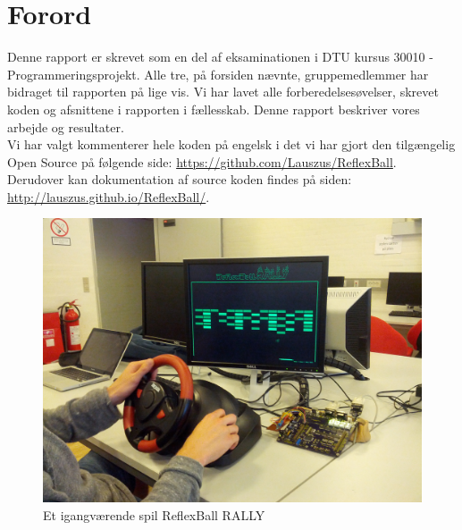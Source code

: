 \chapter{Forord}

Denne rapport er skrevet som en del af eksaminationen i DTU kursus 30010 - Programmeringsprojekt. Alle tre, på forsiden nævnte, gruppemedlemmer har bidraget til rapporten på lige vis. Vi har lavet alle forberedelsesøvelser, skrevet koden og afsnittene i rapporten i fællesskab. Denne rapport beskriver vores arbejde og resultater.
\\

Vi har valgt kommenterer hele koden på engelsk i det vi har gjort den tilgængelig Open Source på følgende side: \url{https://github.com/Lauszus/ReflexBall}.\\
Derudover kan dokumentation af source koden findes på siden: \url{http://lauszus.github.io/ReflexBall/}.
\\

\begin{figure}[h!]
\centering
\includegraphics[width=\textwidth]{figs/forside.jpg}
\caption{Et igangværende spil ReflexBall RALLY}
\label{fig:forside}
\end{figure}